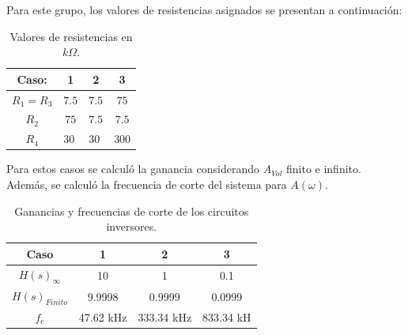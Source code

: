 Para este grupo, los valores de resistencias asignados se presentan a continuación:
\begin{table}[H]
\begin{center}
\begin{tabular}{|c|c|c|c|}
\hline
\textbf{Caso:}              & \textbf{1}               & \textbf{2}               & \textbf{3}                \\ \hline
$R_1=R_3$                   & $7.5$                      & $7.5$                      & $75$                       \\ \hline
$R_2$                       & $75$                       & $7.5$                      & $7.5$                       \\ \hline
\multicolumn{1}{|c|}{$R_4$} & \multicolumn{1}{l|}{$30$} & \multicolumn{1}{l|}{$30$} & \multicolumn{1}{l|}{$300$} \\ \hline
\end{tabular}
\caption{Valores de resistencias en $k\Omega$.}
\label{tabla:resasignadas}
\end{center}
\end{table}

Para estos casos se calculó la ganancia considerando $A_{Vol}$ finito e infinito. Además, se calculó la frecuencia de corte del sistema para $A(\omega)$.

\begin{table}[H]
\begin{center}
\begin{tabular}{|c|c|c|c|}
\hline
\textbf{Caso}            & \textbf{1} & \textbf{2} & \textbf{3} \\ \hline
\textbf{$H(s)_{\infty}$} & 10         & 1          & 0.1        \\ \hline
\textbf{$H(s)_{Finito}$} & 9.9998     & 0.9999     & 0.0999     \\ \hline
\textbf{$f_c$}           & 47.62 kHz   & 333.34 kHz  & 833.34 kH     \\ \hline
\end{tabular}
\caption{Ganancias y frecuencias de corte de los circuitos inversores.}
\label{tabla:gananciasinv}
\end{center}
\end{table}

